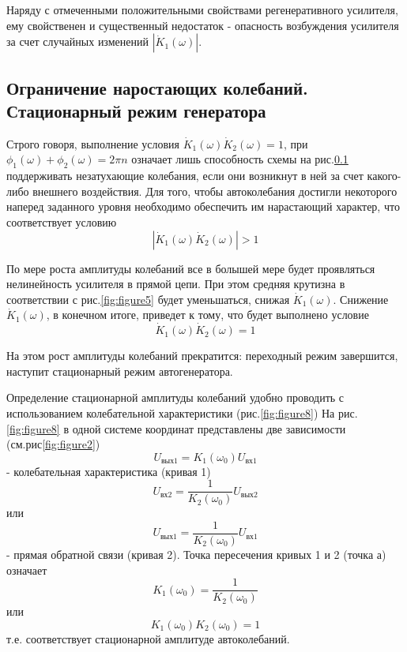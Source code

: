 Наряду с отмеченными положительными свойствами регенеративного усилителя, ему свойственен и существенный недостаток - опасность возбуждения усилителя за счет случайных изменений $|\dot{K}_1(\omega)|$.
\subsection{Ограничение наростающих колебаний. Стационарный режим генератора} 
Строго говоря, выполнение условия $\dot{K}_1(\omega)\dot{K}_2(\omega)=1$, при $\phi_1(\omega)+\phi_2(\omega)=2\pi n$ означает лишь способность схемы на рис.\ref{} поддерживать незатухающие колебания, если они возникнут в ней за счет какого-либо внешнего воздействия. Для того, чтобы автоколебания достигли некоторого наперед заданного уровня необходимо обеспечить им нарастающий характер, что соответствует условию
\begin{equation*}
|\dot{K}_1(\omega)\dot{K}_2(\omega)|>1
\end{equation*}

По мере роста амплитуды колебаний все в болышей мере будет проявляться нелинейность усилителя в прямой цепи. При этом средняя крутизна в соответствии с рис.\ref{fig:figure5} будет уменьшаться, снижая $\dot{K}_1(\omega)$. Снижение $\dot{K}_1(\omega)$, в конечном итоге, приведет к тому, что будет выполнено условие
\begin{equation*}
\dot{K}_1(\omega)\dot{K}_2(\omega)=1
\end{equation*}

На этом рост амплитуды колебаний прекратится: переходный режим завершится, наступит стационарный режим автогенератора.

Определение стационарной амплитуды колебаний удобно проводить с использованием колебательной характеристики (рис.\ref{fig:figure8})
На рис.\ref{fig:figure8} в одной системе координат представлены две зависимости (см.рис\ref{fig:figure2}) 
\begin{equation*}
U_{\text{вых}1}=K_1(\omega_0)U_{\text{вх}1}
\end{equation*}
- колебательная характеристика (кривая 1)
\begin{equation*}
U_{\text{вх}2}=\frac{1}{K_2(\omega_0)}U_{\text{вых}2}
\end{equation*}
или
\begin{equation*}
U_{\text{вых}1}=\frac{1}{K_2(\omega_0)}U_{\text{вх}1}
\end{equation*}
- прямая обратной связи (кривая 2).
Точка пересечения кривых 1 и 2 (точка $а$) означает
\begin{equation*}
K_1(\omega_0)=\frac{1}{K_2(\omega_0)}
\end{equation*}
или
\begin{equation}
K_1(\omega_0)K_2(\omega_0)=1
\label{eq:7}
\end{equation}
т.е. соответствует стационарной амплитуде автоколебаний.

